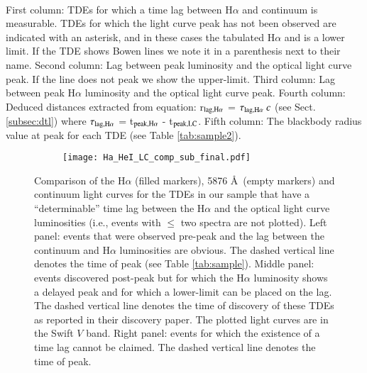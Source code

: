 \documentclass[structabstract]{aa}
\begin{document}
\begin{table}
\begin{tabular}{c c c c c }
\hline
\end{tabular}
\\[-0pt]
First column: 
TDEs for which a time lag between H$\alpha$ and continuum is measurable. TDEs for which the light curve peak has not been observed are indicated with an asterisk, and in these cases the tabulated H$\alpha$ and  is a lower limit.
If the TDE shows  Bowen lines we note it in a parenthesis next to their name. 
Second column: Lag between peak  luminosity and the optical light curve peak. If the line does not peak we show the upper-limit. Third column: Lag between peak H$\alpha$ luminosity and the optical light curve peak. %
Fourth column: Deduced distances extracted from equation: r$_{\rm lag,H\alpha}$ = $\tau_{\rm lag,H\alpha} ~c$ (see Sect. \ref{subsec:dtl}) where $\tau_{\rm lag,H\alpha}$ = t$_{\rm peak,H\alpha}$ - t$_{\rm peak,LC}$. Fifth column: The blackbody radius value at peak for each TDE (see Table \ref{tab:sample2}).
\end{table}


\begin{figure*}
        \centering
        \begin{subfigure}[b]{1\textwidth}
            \centering
            \texttt{[image: Ha\_HeI\_LC\_comp\_sub\_final.pdf]}
        \end{subfigure}
        \caption
        {Comparison of the H$\alpha$ (filled markers),  5876 \AA\, (empty markers) and continuum light curves for the TDEs in our sample that have a ``determinable'' time lag between the H$\alpha$ and the optical light curve luminosities (i.e., events with $\leq$ two spectra are not plotted). Left panel: events that were observed pre-peak and the lag between the continuum and H$\alpha$ luminosities are obvious. The dashed vertical line denotes the time of peak (see Table \ref{tab:sample}). Middle panel: events discovered post-peak but for which the H$\alpha$ luminosity shows a delayed peak and for which  a lower-limit can be placed on the lag. The dashed vertical line denotes the time of discovery of these TDEs as reported in their discovery paper. The plotted light curves are in the Swift $V$ band. Right panel: events for which the existence of a time lag cannot be claimed. The dashed vertical line denotes the time of peak.} 
        \label{fig:ha_heI_lc}
    \end{figure*}
\end{document}
